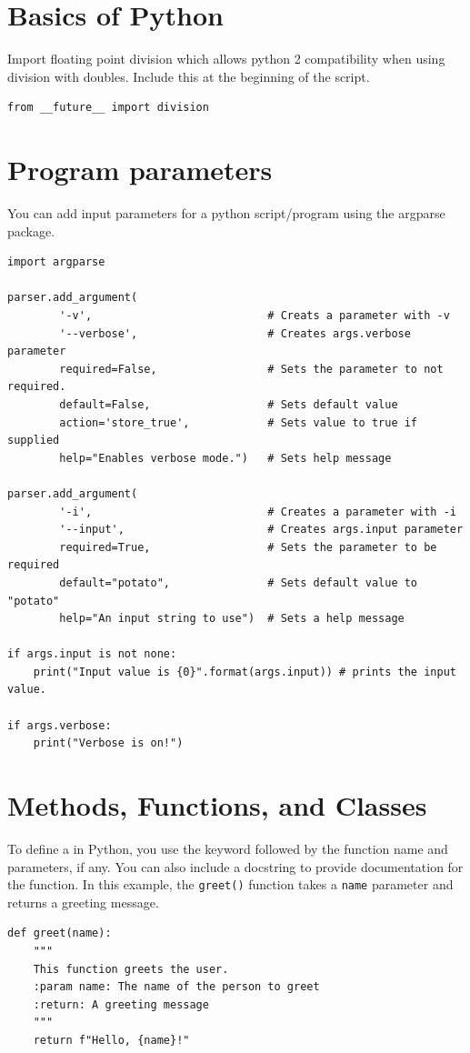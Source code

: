 \section{Basics of Python}

Import floating point division which allows python 2 compatibility when using division with doubles. Include this at the beginning of the script.
\begin{lstlisting}
from __future__ import division
\end{lstlisting}














\section{Program parameters}

You can add input parameters for a python script/program using the argparse package.
\begin{lstlisting}
import argparse

parser.add_argument(
		'-v',							# Creats a parameter with -v
		'--verbose',					# Creates args.verbose parameter
		required=False,					# Sets the parameter to not required.
		default=False,					# Sets default value
		action='store_true',			# Sets value to true if supplied
		help="Enables verbose mode.")	# Sets help message
					
parser.add_argument(
		'-i',							# Creates a parameter with -i
		'--input',						# Creates args.input parameter
		required=True,					# Sets the parameter to be required
		default="potato",				# Sets default value to "potato"
		help="An input string to use")	# Sets a help message
		
if args.input is not none:
	print("Input value is {0}".format(args.input)) # prints the input value.
	
if args.verbose:
	print("Verbose is on!")
\end{lstlisting}





\section{Methods, Functions, and Classes}


To define a  in Python, you use the  keyword followed by the function name and parameters, if any. You can also include a docstring to provide documentation for the function. In this example, the \texttt{greet()} function takes a \texttt{name} parameter and returns a greeting message.
\begin{lstlisting}
def greet(name):
    """
    This function greets the user.
    :param name: The name of the person to greet
    :return: A greeting message
    """
    return f"Hello, {name}!"
\end{lstlisting}


